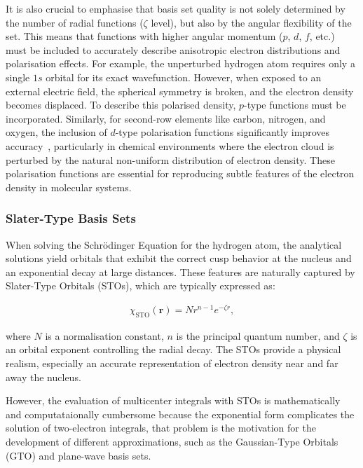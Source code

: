 It is also crucial to emphasise that basis set quality is not solely determined
by the number of radial functions ($\zeta$ level), but also by the angular
flexibility of the set. This means that functions with higher angular momentum
($p$, $d$, $f$, etc.) must be included to accurately describe anisotropic
electron distributions and polarisation effects. For example, the unperturbed
hydrogen atom requires only a single $1s$ orbital for its exact wavefunction.
However, when exposed to an external electric field, the spherical symmetry is
broken, and the electron density becomes displaced. To describe this polarised
density, $p$-type functions must be incorporated. Similarly, for second-row
elements like carbon, nitrogen, and oxygen, the inclusion of $d$-type
polarisation functions significantly improves accuracy~\cite{Jensen2001},
particularly in chemical environments where the electron cloud is perturbed by
the natural non-uniform distribution of electron density. These polarisation
functions are essential for reproducing subtle features of the electron density
in molecular systems.

\subsubsection{Slater-Type Basis Sets}

When solving the Schrödinger Equation for the hydrogen atom, the analytical
solutions yield orbitals that exhibit the correct cusp behavior at the nucleus
and an exponential decay at large distances. These features are naturally
captured by Slater-Type Orbitals (\glspl{STO}), which are typically expressed as:

\begin{align}
  \chi_{\mathrm{STO}}(\mathbf{r}) = N r^{n-1} e^{-\zeta r},
\end{align}

\noindent where $N$ is a normalisation constant, $n$ is the principal quantum
number, and $\zeta$ is an orbital exponent controlling the radial decay. The
\glspl{STO} provide a physical realism, especially an accurate representation of
electron density near and far away the nucleus.

\newpage
However, the evaluation of multicenter integrals with \glspl{STO} is
mathematically and computataionally cumbersome because the exponential form
complicates the solution of two-electron integrals, that problem is the
motivation for the development of different approximations, such as the
Gaussian-Type Orbitals (\gls{GTO}) and plane-wave basis sets.

